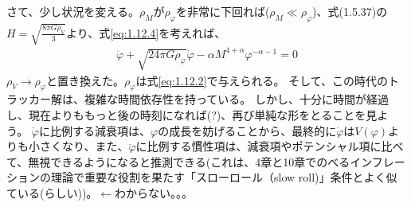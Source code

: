 \documentclass[11pt]{ltjsarticle}
\theoremstyle{plain}
\theoremstyle{break}
\begin{document}
さて、少し状況を変える。$\rho_M$が$\rho_\varphi$を非常に下回れば($\rho_M\ll \rho_{\varphi}$)、式(1.5.37)の$H=\sqrt{\frac{8\pi G \rho_V}{3}}$より、式\eqref{eq:1.12.4}を考えれば、
\begin{align}
  \ddot{\varphi}+\sqrt{24 \pi G \rho_{\varphi}} \dot{\varphi}-\alpha M^{4+\alpha} \varphi^{-\alpha-1}=0
\end{align}%
$\rho_V \to \rho_\varphi$と置き換えた。$\rho_\varphi$は式\eqref{eq:1.12.2}で与えられる。
そして、この時代のトラッカー解は、複雑な時間依存性を持っている。
しかし、十分に時間が経過し、現在よりももっと後の時刻になれば(?)、再び単純な形をとることを見よう。
$\dot{\varphi}$に比例する減衰項は、$\varphi$の成長を妨げることから、最終的に$\dot{\varphi}$は$V(\varphi)$よりも小さくなり、また、$\ddot{\varphi}$に比例する慣性項は、減衰項やポテンシャル項に比べて、無視できるようになると推測できる(これは、4章と10章でのべるインフレーションの理論で重要な役割を果たす「スローロール（slow roll)」条件とよく似ている(らしい))。$\leftarrow$わからない。。。\dag
\end{document}

